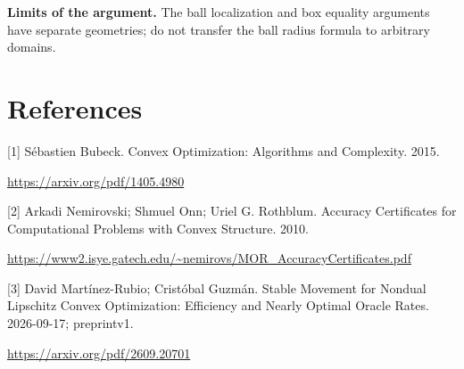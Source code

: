 \documentclass[10pt,a4paper]{article}
\begin{document}
\textbf{Limits of the argument.} The ball localization and box equality arguments have separate geometries; do not transfer the ball radius formula to arbitrary domains.

\section{References}
[1] Sébastien Bubeck. Convex Optimization: Algorithms and Complexity. 2015.

\url{https://arxiv.org/pdf/1405.4980}

[2] Arkadi Nemirovski; Shmuel Onn; Uriel G. Rothblum. Accuracy Certificates for Computational Problems with Convex Structure. 2010.

\url{https://www2.isye.gatech.edu/~nemirovs/MOR_AccuracyCertificates.pdf}

[3] David Martínez-Rubio; Cristóbal Guzmán. Stable Movement for Nondual Lipschitz Convex Optimization: Efficiency and Nearly Optimal Oracle Rates. 2026-09-17; preprintv1.

\url{https://arxiv.org/pdf/2609.20701}
\end{document}
